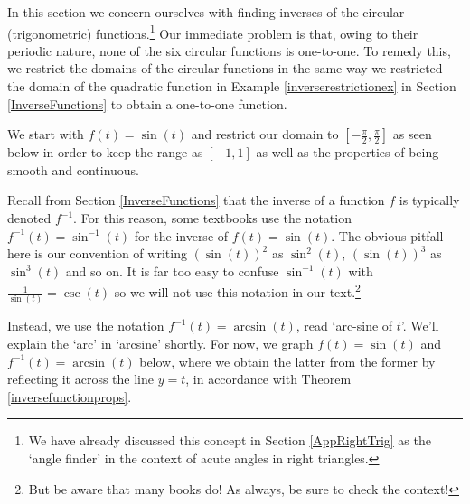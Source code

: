 \documentclass{ximera}
\begin{document}
	\author{Stitz-Zeager}




\setcounter{footnote}{0}

\label{TheInverseTrigonometricFunctions}

In this section we concern ourselves with finding inverses of the circular (trigonometric) functions.\footnote{We have already discussed this concept in Section \ref{AppRightTrig} as the `angle finder' in the context of acute angles in right triangles.}  Our immediate problem is that, owing to their periodic nature, none of the six circular functions is  one-to-one.  To remedy this, we restrict the domains of the circular functions in the same way we restricted the domain of the quadratic function in Example \ref{inverserestrictionex} in Section \ref{InverseFunctions} to obtain a one-to-one function.  


We start with $f(t)  = \sin(t)$ and restrict our domain to $\left[ -\frac{\pi}{2}, \frac{\pi}{2}\right]$ as seen below in order to keep the range as $[-1,1]$ as well as the properties of being smooth and continuous.

 

\begin{center}
\end{center} 


 

Recall from Section \ref{InverseFunctions} that the inverse of a function $f$ is typically denoted $f^{-1}$.  For this reason, some textbooks use the notation $f^{-1}(t) = \sin^{-1}(t)$ for the inverse of $f(t) = \sin(t)$.  The obvious pitfall here is our convention of writing $(\sin(t))^2$ as $\sin^{2}(t)$, $(\sin(t))^3$ as $\sin^{3}(t)$ and so on.  It is far too easy to confuse $\sin^{-1}(t)$ with  $\frac{1}{\sin(t)} = \csc(t)$ so we will not use this notation in our text.\footnote{But be aware that many books do! As always, be sure to check the context!}


Instead, we use the notation $f^{-1}(t) = \arcsin(t)$, read `arc-sine of $t$'.  We'll explain the `arc' in `arcsine' shortly.  For now, we graph $f(t) = \sin(t)$ and $f^{-1}(t) = \arcsin(t)$ below, where we obtain the latter from the former by reflecting it across the line $y=t$, in accordance with Theorem \ref{inversefunctionprops}. 
\end{document}
